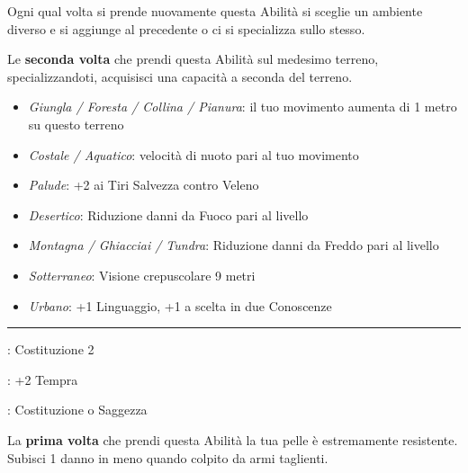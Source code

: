\begin{multicols}{2}
\medskip

Ogni qual volta si prende nuovamente questa Abilità si sceglie un ambiente diverso e si aggiunge al precedente o ci si specializza sullo stesso.

Le \textbf{seconda volta} che prendi questa Abilità sul medesimo terreno, specializzandoti, acquisisci una capacità a seconda del terreno.

\begin{itemize}[leftmargin=*] \setlength{\itemsep}{0pt}

\item \emph{Giungla / Foresta / Collina / Pianura}: il tuo movimento aumenta di 1 metro su questo terreno

\item \emph{Costale / Aquatico}: velocità di nuoto pari al tuo movimento

\item \emph{Palude}: +2 ai Tiri Salvezza contro Veleno

\item \emph{Desertico}: Riduzione danni da Fuoco pari al livello

\item \emph{Montagna / Ghiacciai / Tundra}: Riduzione danni da Freddo pari al livello

\item \emph{Sotterraneo}: Visione crepuscolare 9 metri

\item \emph{Urbano}: +1 Linguaggio, +1 a scelta in due Conoscenze

\end{itemize}

\smallskip\noindent\rule{\linewidth}{2pt} \hypertarget{Pelle Coriacea}{}\medskip{}
\noindent
\begin{description}[noitemsep, topsep=0pt, parsep=0pt, partopsep=0pt, leftmargin=0cm, labelwidth=2.5cm]
    \item[\textbf{Requisito}]: Costituzione 2
    \item[\textbf{Tiri Salvezza}]: +2 Tempra
    \item[\textbf{Caratteristica}]: Costituzione o Saggezza
\end{description}

La \textbf{prima volta} che prendi questa Abilità la tua pelle è estremamente resistente. Subisci 1 danno in meno quando colpito da armi taglienti.


\end{multicols}

